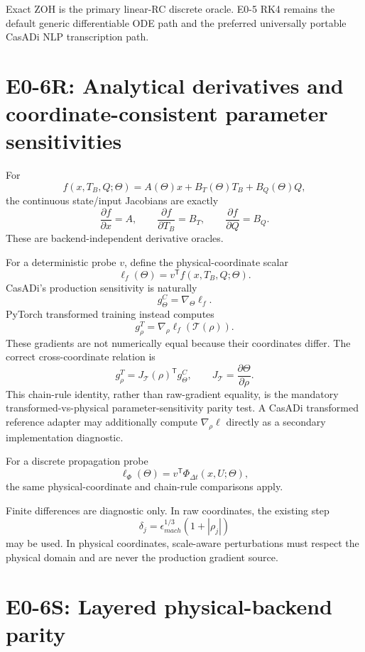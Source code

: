 \documentclass[11pt]{article}
\begin{document}
Exact ZOH is the primary linear-RC discrete oracle. E0-5 RK4 remains the default
generic differentiable ODE path and the preferred universally portable CasADi
NLP transcription path.

\section{E0-6R: Analytical derivatives and coordinate-consistent parameter sensitivities}

For
\[
f(x,T_B,Q;\Theta)=A(\Theta)x+B_T(\Theta)T_B+B_Q(\Theta)Q,
\]
the continuous state/input Jacobians are exactly
\[
\boxed{\frac{\partial f}{\partial x}=A},\qquad
\boxed{\frac{\partial f}{\partial T_B}=B_T},\qquad
\boxed{\frac{\partial f}{\partial Q}=B_Q}.
\]
These are backend-independent derivative oracles.

For a deterministic probe $v$, define the physical-coordinate scalar
\[
\ell_f(\Theta)=v^{\mathsf T}f(x,T_B,Q;\Theta).
\]
CasADi's production sensitivity is naturally
\[
\boxed{g_\Theta^C=\nabla_\Theta\ell_f.}
\]
PyTorch transformed training instead computes
\[
\boxed{g_\rho^T=\nabla_\rho\ell_f(\mathcal T(\rho)).}
\]
These gradients are not numerically equal because their coordinates differ.
The correct cross-coordinate relation is
\[
\boxed{
g_\rho^T
=J_{\mathcal T}(\rho)^{\mathsf T}g_\Theta^C,
\qquad
J_{\mathcal T}=\frac{\partial\Theta}{\partial\rho}.
}
\]
This chain-rule identity, rather than raw-gradient equality, is the mandatory
transformed-vs-physical parameter-sensitivity parity test. A CasADi transformed
reference adapter may additionally compute $\nabla_\rho\ell$ directly as a
secondary implementation diagnostic.

For a discrete propagation probe
\[
\ell_\Phi(\Theta)=v^{\mathsf T}\Phi_{\Delta t}(x,U;\Theta),
\]
the same physical-coordinate and chain-rule comparisons apply.

Finite differences are diagnostic only. In raw coordinates, the existing step
\[
\delta_j=\epsilon_{mach}^{1/3}(1+|\rho_j|)
\]
may be used. In physical coordinates, scale-aware perturbations must respect the
physical domain and are never the production gradient source.

\section{E0-6S: Layered physical-backend parity}
\end{document}
